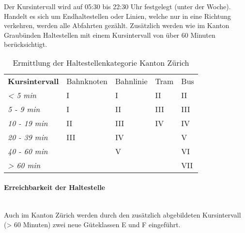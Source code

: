 Der Kursintervall wird auf 05:30 bis 22:30 Uhr festgelegt (unter der Woche).
Handelt es sich um Endhaltestellen oder Linien, welche nur in eine Richtung verkehren, werden alle Abfahrten gezählt.
Zusätzlich werden wie im Kanton Graubünden  Haltestellen mit einem Kursintervall von über 60 Minuten berücksichtigt.

\begin{table}[ht]
    \begin{tabular}[c]{l p{2.9cm} p{2.8cm} p{2.8cm} p{2.8cm}}
        \midrule
        \textbf{Kursintervall}
                                & Bahnknoten
                                & Bahnlinie
                                & Tram
                                & Bus\\
        \textit{< 5 min}
                                & I
                                & I
                                & II
                                & II\\
        \textit{5 - 9 min}
                                & I
                                & II
                                & III
                                & III\\
        \textit{10 - 19 min}
                                & II
                                & III
                                & IV
                                & IV\\
        \textit{20 - 39 min}
                                & III
                                & IV
                                &
                                & V\\
        \textit{40 - 60 min}
                                &
                                & V
                                &
                                & VI\\
        \cellcolor{red!25}\textit{> 60 min}
                                &
                                &
                                &
                                & \cellcolor{red!25}VII\\
        \bottomrule
    \end{tabular}
    \caption{Ermittlung der Haltestellenkategorie Kanton Zürich}
    \label{table:Ermittlung der Haltestellenkategorie Kanton Zürich}
\end{table}


\paragraph{Erreichbarkeit der Haltestelle}~\\
\label{Berechnungsmethodik Kanton Zürich:Erreichbarkeit der Haltestelle}
Auch im Kanton Zürich werden durch den zusätzlich abgebildeten Kursintervall (> 60 Minuten) zwei neue Güteklassen E und F eingeführt.

